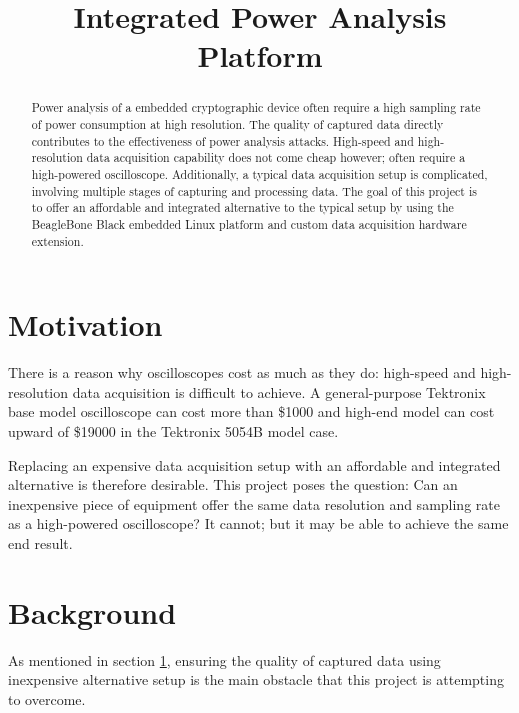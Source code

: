 \documentclass[conference]{IEEEtran}
\begin{document}
\title{Integrated Power Analysis Platform}


\author{
}
\maketitle

\begin{abstract}
Power analysis of a embedded cryptographic device often require a high sampling rate of power consumption at high resolution. The quality of captured data directly contributes to the effectiveness of power analysis attacks. High-speed and high-resolution data acquisition capability does not come cheap however; often require a high-powered oscilloscope. Additionally, a typical data acquisition setup is complicated, involving multiple stages of capturing and processing data. The goal of this project is to offer an affordable and integrated alternative to the typical setup by using the BeagleBone Black embedded Linux platform and custom data acquisition hardware extension.
\end{abstract}

\section{Motivation}\label{sec:motivation}
There is a reason why oscilloscopes cost as much as they do: high-speed and high-resolution data acquisition is difficult to achieve. A general-purpose Tektronix base model oscilloscope can cost more than \$1000 and high-end model can cost upward of \$19000 in the Tektronix 5054B model case.

Replacing an expensive data acquisition setup with an affordable and integrated alternative is therefore desirable. This project poses the question: Can an inexpensive piece of equipment offer the same data resolution and sampling rate as a high-powered oscilloscope? It cannot; but it may be able to achieve the same end result.

\section{Background}\label{sec:background}
As mentioned in section \ref{sec:motivation}, ensuring the quality of captured data using inexpensive alternative setup is the main obstacle that this project is attempting to overcome. 
\end{document}

